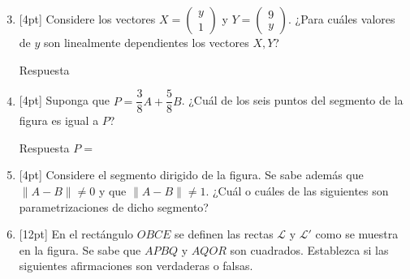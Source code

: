 \documentclass[11pt]{article}
\newcommand{\vect}[2]{\begin{pmatrix}#1\\#2\end{pmatrix}}
\begin{document}
\begin{enumerate}
\setcounter{enumi}{2}
\item{}[4pt] Considere los vectores $X=\vect{y}{1}$ y $Y=\vect{9}{y}$. ¿Para cuáles valores de $y$ son linealmente dependientes los vectores $X,Y$?

Respuesta \underline{\hspace{4cm}}

\item{}[4pt] Suponga que $P=\dfrac{3}{8}A+\dfrac{5}{8}B$. ¿Cuál de los seis puntos del segmento de la figura es igual a $P$?

\begin{center}
\end{center}

Respuesta $P=$ \underline{\hspace{3cm}}

\item{}[4pt] Considere el segmento dirigido de la figura. Se sabe además que $\|A-B\|\neq 0$ y que $\|A-B\|\neq 1$. ¿Cuál o cuáles de las siguientes son parametrizaciones de dicho segmento?

\begin{center}
\end{center}


\item{}[12pt] En el rectángulo $OBCE$ se definen las rectas $\mathcal{L}$ y $\mathcal{L}'$ como se muestra en la figura. Se sabe que $APBQ$ y $AQOR$ son cuadrados. Establezca si las siguientes afirmaciones son verdaderas o falsas.


\end{enumerate}
\end{document}
